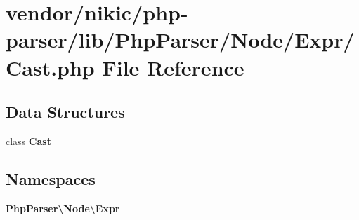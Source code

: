 \section{vendor/nikic/php-\/parser/lib/\+Php\+Parser/\+Node/\+Expr/\+Cast.php File Reference}
\label{_cast_8php}
\subsection*{Data Structures}
\begin{DoxyCompactItemize}
\item 
class {\bf Cast}
\end{DoxyCompactItemize}
\subsection*{Namespaces}
\begin{DoxyCompactItemize}
\item 
 {\bf Php\+Parser\textbackslash{}\+Node\textbackslash{}\+Expr}
\end{DoxyCompactItemize}
